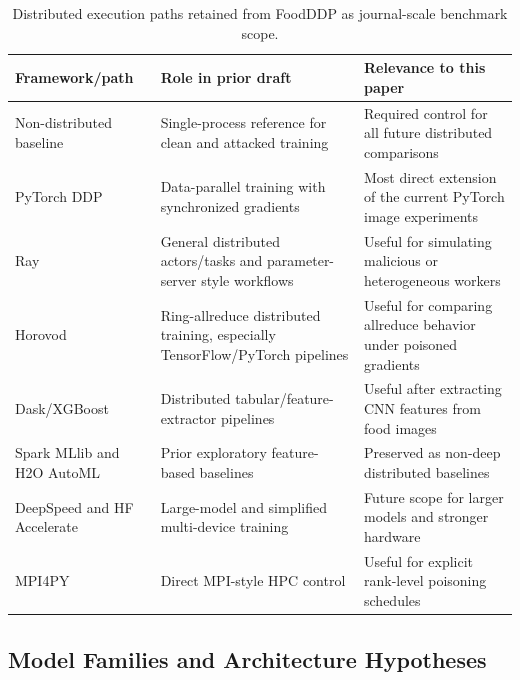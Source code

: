﻿\documentclass[6p,10pt,times]{ieeeaccess}
\begin{document}
\begin{table}[t]
\centering
\caption{Distributed execution paths retained from FoodDDP as journal-scale benchmark scope.}
\label{tab:distributedscope}
\small
\begin{tabular}{p{}p{}p{}}
\toprule
Framework/path & Role in prior draft & Relevance to this paper \\
\midrule
Non-distributed baseline & Single-process reference for clean and attacked training & Required control for all future distributed comparisons \\
PyTorch DDP & Data-parallel training with synchronized gradients & Most direct extension of the current PyTorch image experiments \\
Ray~\cite{moritz2018ray} & General distributed actors/tasks and parameter-server style workflows & Useful for simulating malicious or heterogeneous workers \\
Horovod~\cite{sergeev2018horovod} & Ring-allreduce distributed training, especially TensorFlow/PyTorch pipelines & Useful for comparing allreduce behavior under poisoned gradients \\
Dask/XGBoost & Distributed tabular/feature-extractor pipelines & Useful after extracting CNN features from food images \\
Spark MLlib and H2O AutoML & Prior exploratory feature-based baselines & Preserved as non-deep distributed baselines \\
DeepSpeed and HF Accelerate & Large-model and simplified multi-device training & Future scope for larger models and stronger hardware \\
MPI4PY & Direct MPI-style HPC control & Useful for explicit rank-level poisoning schedules \\
\bottomrule
\end{tabular}
\end{table}

\subsection{Model Families and Architecture Hypotheses}
\end{document}
